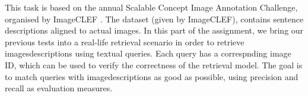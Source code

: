 This task is based on the annual Scalable Concept Image Annotation Challenge, organised by ImageCLEF \cite{imageclef}. The dataset (given by ImageCLEF), contains sentence descriptions aligned to actual images. In this part of the assignment, we bring our previous tests into a real-life retrieval scenario in order to retrieve imagesdescriptions using textual queries. Each query has a correspnding image ID, which can be used to verify the correctness of the retrieval model. The goal is to match queries with imagedescriptions as good as possible, using precision and recall as evaluation measures.